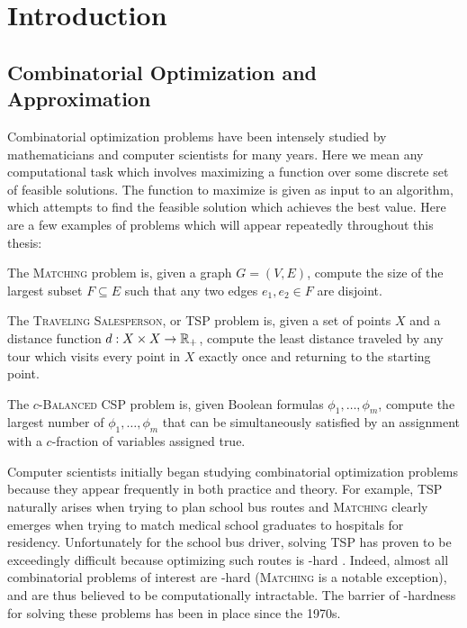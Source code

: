 \chapter{Introduction}\label{cha:introduction}

\section{Combinatorial Optimization and Approximation}
Combinatorial optimization problems have been intensely studied by mathematicians and computer scientists for many years.
Here we mean any computational task which involves maximizing a function over some discrete set of feasible solutions.
The function to maximize is given as input to an algorithm, which attempts to find the feasible solution which achieves the best value. 
Here are a few examples of problems which will appear repeatedly throughout this thesis: 
\begin{example}
The \textsc{Matching} problem is, given a graph $G = (V,E)$, compute the size of the largest subset $F \subseteq E$ such that any two edges $e_1,e_2 \in F$ are disjoint.
\end{example}
\begin{example}
The \textsc{Traveling Salesperson}, or \textsc{TSP} problem is, given a set of points $X$ and a distance function $d: X \times X \rightarrow \mathbb R_+$, compute the least distance traveled by any tour which visits every point in $X$ exactly once and returning to the starting point.
\end{example}
\begin{example}
The \textsc{$c$-Balanced CSP} problem is, given Boolean formulas $\phi_1,\dots,\phi_m$, compute the largest number of $\phi_1,\dots,\phi_m$ that can be simultaneously satisfied by an assignment with a $c$-fraction of variables assigned true.
\end{example}

Computer scientists initially began studying combinatorial optimization problems because they appear frequently in both practice and theory.
For example, \textsc{TSP} naturally arises when trying to plan school bus routes and \textsc{Matching} clearly emerges when trying to match medical school graduates to hospitals for residency. Unfortunately for the school bus driver, solving \textsc{TSP} has proven to be exceedingly difficult because optimizing such routes is \np-hard \cite{Karp1972}. Indeed, almost all combinatorial problems of interest are \np-hard (\textsc{Matching} is a notable exception), and are thus believed to be computationally intractable. The barrier of \np-hardness for solving these problems has been in place since the 1970s.

